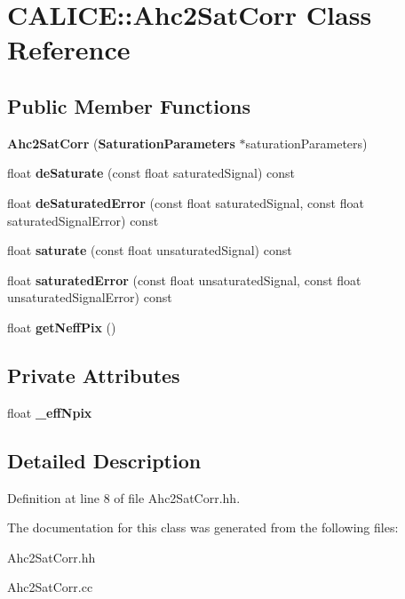 \section{C\-A\-L\-I\-C\-E\-:\-:Ahc2\-Sat\-Corr Class Reference}
\label{classCALICE_1_1Ahc2SatCorr}
\subsection*{Public Member Functions}
\begin{DoxyCompactItemize}
\item 
{\bfseries Ahc2\-Sat\-Corr} ({\bf Saturation\-Parameters} $\ast$saturation\-Parameters)\label{classCALICE_1_1Ahc2SatCorr_a552b6621c2f878725d70a1514cc50cc5}

\item 
float {\bfseries de\-Saturate} (const float saturated\-Signal) const \label{classCALICE_1_1Ahc2SatCorr_ab6c572ce1b1ed8d4faa47911fea1443a}

\item 
float {\bfseries de\-Saturated\-Error} (const float saturated\-Signal, const float saturated\-Signal\-Error) const \label{classCALICE_1_1Ahc2SatCorr_ae0ece65ff89cd1e35f841cf866f4a6db}

\item 
float {\bfseries saturate} (const float unsaturated\-Signal) const \label{classCALICE_1_1Ahc2SatCorr_a4649f57514389e648d95f13925dc395d}

\item 
float {\bfseries saturated\-Error} (const float unsaturated\-Signal, const float unsaturated\-Signal\-Error) const \label{classCALICE_1_1Ahc2SatCorr_ac099e86272cc99952a00afcf2c891e71}

\item 
float {\bfseries get\-Neff\-Pix} ()\label{classCALICE_1_1Ahc2SatCorr_a713a0e340580379a17d4aeae3948cef8}

\end{DoxyCompactItemize}
\subsection*{Private Attributes}
\begin{DoxyCompactItemize}
\item 
float {\bfseries \-\_\-eff\-Npix}\label{classCALICE_1_1Ahc2SatCorr_ac4a9b30dc0ce40a3125995cae2c293ae}

\end{DoxyCompactItemize}


\subsection{Detailed Description}


Definition at line 8 of file Ahc2\-Sat\-Corr.\-hh.



The documentation for this class was generated from the following files\-:\begin{DoxyCompactItemize}
\item 
Ahc2\-Sat\-Corr.\-hh\item 
Ahc2\-Sat\-Corr.\-cc\end{DoxyCompactItemize}
